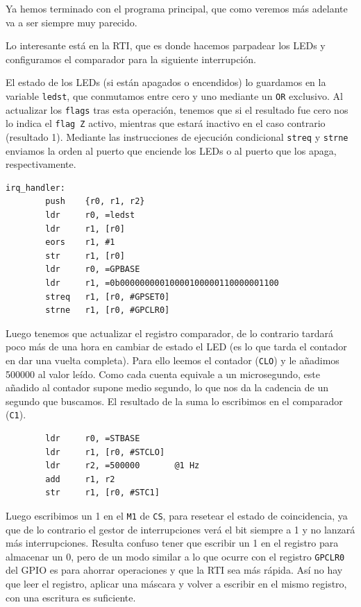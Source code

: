 Ya hemos terminado con el programa principal, que como veremos más adelante va a ser
siempre muy parecido.

Lo interesante está en la RTI, que es donde hacemos parpadear los LEDs y configuramos
el comparador para la siguiente interrupción.

El estado de los LEDs (si están apagados o encendidos) lo guardamos en la variable
{\tt ledst}, que conmutamos entre cero y uno mediante un {\tt OR} exclusivo. Al
actualizar los {\tt flags} tras esta operación, tenemos que si el resultado fue
cero nos lo indica el {\tt flag Z} activo, mientras que estará inactivo en el
caso contrario (resultado 1). Mediante las instrucciones de ejecución condicional
{\tt streq} y {\tt strne} enviamos la orden al puerto que enciende los LEDs o al
puerto que los apaga, respectivamente.

\begin{lstlisting}
irq_handler:
        push    {r0, r1, r2}
        ldr     r0, =ledst
        ldr     r1, [r0]
        eors    r1, #1
        str     r1, [r0]
        ldr     r0, =GPBASE
        ldr     r1, =0b00000000010000100000110000001100
        streq   r1, [r0, #GPSET0]
        strne   r1, [r0, #GPCLR0]
\end{lstlisting}

Luego tenemos que actualizar el registro comparador, de lo contrario tardará poco más
de una hora en cambiar de estado el LED (es lo que tarda el contador en dar una vuelta
completa). Para ello leemos el contador ({\tt CLO}) y le añadimos 500000 al valor leído. Como cada
cuenta equivale a un microsegundo, este añadido al contador supone medio segundo, lo
que nos da la cadencia de un segundo que buscamos. El resultado de la suma lo escribimos
en el comparador ({\tt C1}).

\begin{lstlisting}
        ldr     r0, =STBASE
        ldr     r1, [r0, #STCLO]
        ldr     r2, =500000       @1 Hz
        add     r1, r2
        str     r1, [r0, #STC1]
\end{lstlisting}

Luego escribimos un 1 en el {\tt M1} de {\tt CS}, para resetear el estado de coincidencia, ya
que de lo contrario el gestor de interrupciones verá el bit siempre a 1 y no lanzará más
interrupciones. Resulta confuso tener que escribir un 1 en el registro para almacenar un 0, pero
de un modo similar a lo que ocurre con el registro {\tt GPCLR0} del GPIO es para ahorrar
operaciones y que la RTI sea más rápida. Así no hay que leer el registro, aplicar una máscara y
volver a escribir en el mismo registro, con una escritura es suficiente.

